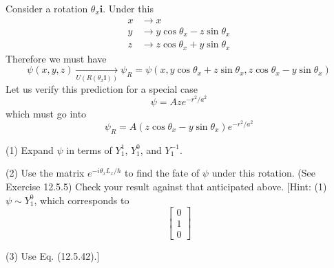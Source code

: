 \documentclass[../principles-of-quantum-mechanics.tex]{subfiles}
\begin{document}
\begin{questions}
		\question Consider a rotation $\theta_x\mathbf{i}$. Under this
		\begin{align*}
			x &\to x \\
			y &\to y\cos\theta_x - z\sin\theta_x \\
			z &\to z\cos\theta_x + y\sin\theta_x
		\end{align*}
		Therefore we must have
		$$\psi(x, y, z) \xrightarrow[U(R(\theta_x\mathbf{i}))]{}\psi_R = \psi(x, y\cos\theta_x + z\sin\theta_x, z\cos\theta_x - y\sin\theta_x)$$
		Let us verify this prediction for a special case
		$$\psi = Aze^{-r^2/a^2}$$
		which must go into
		$$\psi_R = A(z \cos\theta_x - y\sin\theta_x)e^{-r^2/a^2}$$
		
		(1) Expand $\psi$ in terms of $Y_1^1$, $Y_1^0$, and $Y_1^{-1}$.
		
		(2) Use the matrix $e^{-i\theta_x L_x/\hbar}$ to find the fate of $\psi$ under this rotation. (See Exercise 12.5.5) Check your result against that anticipated above. [Hint: (1) $\psi \sim Y_1^0$, which corresponds to
		$$\begin{bmatrix}0 \\ 1 \\ 0\end{bmatrix}$$
		
		(3) Use Eq. (12.5.42).]
		

\end{questions}
\end{document}
